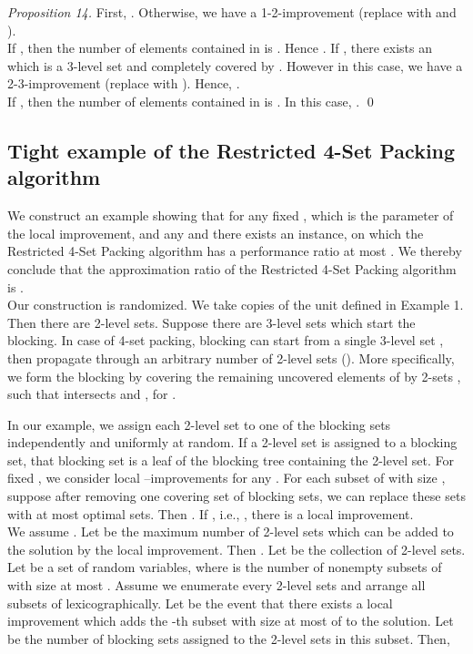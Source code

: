 \documentclass[runningheads,a4paper]{llncs}
\numberwithin{equation}{section}
\begin{document}
\begin{proof}[Proposition 14]
First, . Otherwise, we have a 1-2-improvement (replace  with  and ).  \\
If , then the number of elements contained in
 is . Hence . If , there exists an  which is a 3-level set and completely covered by . However in this case, we have a 2-3-improvement (replace  with ). Hence, . \\
If , then the number of elements contained in
 is . In this case, .  \qed
\end{proof}

\subsection{Tight example of the Restricted 4-Set Packing algorithm}

We construct an example showing that for any fixed , which is the parameter of the local improvement, and any  and there exists an instance, on which the Restricted 4-Set Packing algorithm has a performance ratio at most . We thereby conclude that the approximation ratio of the Restricted 4-Set Packing algorithm is . \\

Our construction is randomized. We take  copies of the unit  defined in Example 1. Then there are  2-level sets. Suppose there are  3-level sets which start the blocking. In case of 4-set packing, blocking can start from a single 3-level set , then propagate through an arbitrary number of 2-level sets  (). More specifically, we form the blocking by covering the remaining uncovered elements of  by 2-sets , such that  intersects  and , for .

In our example, we assign each 2-level set to one of the  blocking sets independently and uniformly at random. If a 2-level set is assigned to a blocking set, that blocking set is a leaf of the blocking tree containing the 2-level set. For fixed , we consider local --improvements for any . For each subset of  with size , suppose after removing one covering set of  blocking sets, we can replace these  sets with at most  optimal sets. Then . If , i.e., , there is a local improvement. \\

We assume . Let  be the maximum number of 2-level sets which can be added to the solution by the local improvement. Then . Let  be the collection of 2-level sets. Let  be a set of random variables, where  is the number of nonempty subsets of  with size at most . Assume we enumerate every 2-level sets and arrange all subsets of  lexicographically. Let  be the event that there exists a local improvement which adds the -th subset with size at most  of  to the solution. Let  be the number of blocking sets assigned to the 2-level sets in this subset. Then,
\end{document}
